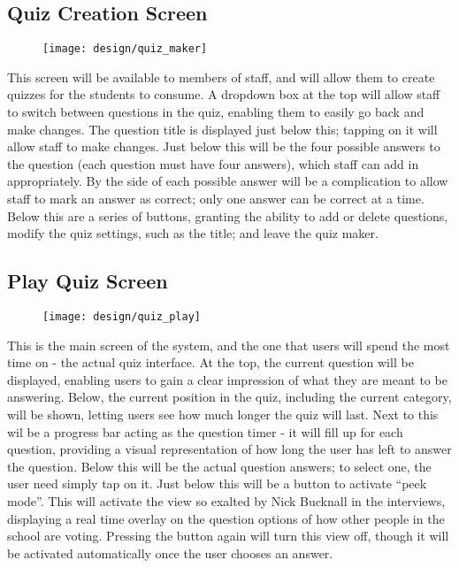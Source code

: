 \clearpage

\subsection{Quiz Creation Screen}
\begin{figure}[h!]
  \texttt{[image: design/quiz\_maker]}
\end{figure}

This screen will be available to members of staff, and will allow them to create quizzes for the students to consume. A dropdown box at the top will allow staff to switch between questions in the quiz, enabling them to easily go back and make changes. The question title is displayed just below this; tapping on it will allow staff to make changes. Just below this will be the four possible answers to the question (each question must have four answers), which staff can add in appropriately. By the side of each possible answer will be a complication to allow staff to mark an answer as correct; only one answer can be correct at a time. Below this are a series of buttons, granting the ability to add or delete questions, modify the quiz settings, such as the title; and leave the quiz maker.

\clearpage

\subsection{Play Quiz Screen}
\begin{figure}[h!]
  \texttt{[image: design/quiz\_play]}
\end{figure}

This is the main screen of the system, and the one that users will spend the most time on - the actual quiz interface. At the top, the current question will be displayed, enabling users to gain a clear impression of what they are meant to be answering. Below, the current position in the quiz, including the current category, will be shown, letting users see how much longer the quiz will last. Next to this wil be a progress bar acting as the question timer - it will fill up for each question, providing a visual representation of how long the user has left to answer the question. Below this will be the actual question answers; to select one, the user need simply tap on it. Just below this will be a button to activate ``peek mode''. This will activate the view so exalted by Nick Bucknall in the interviews, displaying a real time overlay on the question options of how other people in the school are voting. Pressing the button again will turn this view off, though it will be activated automatically once the user chooses an answer.
